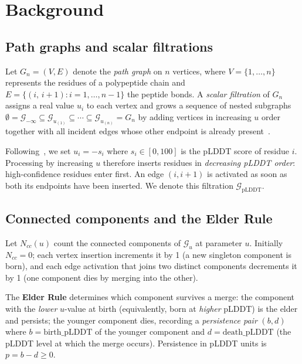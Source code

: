 \section{Background}
\label{sec:background}

\subsection{Path graphs and scalar filtrations}

Let $G_n = (V, E)$ denote the \emph{path graph} on $n$ vertices, where
$V = \{1,\ldots,n\}$ represents the residues of a polypeptide chain and
$E = \{(i,\,i{+}1) : i = 1,\ldots,n{-}1\}$ the peptide bonds.
A \emph{scalar filtration} of $G_n$ assigns a real value $u_i$ to each
vertex and grows a sequence of nested subgraphs
$\emptyset = \mathcal{G}_{-\infty} \subseteq \mathcal{G}_{u_{(1)}} \subseteq
\cdots \subseteq \mathcal{G}_{u_{(n)}} = G_n$
by adding vertices in increasing $u$ order together with all incident
edges whose other endpoint is already present~\cite{edelsbrunner2010computational}.

Following~\cite{cazals2025alphafold}, we set $u_i = -s_i$ where $s_i \in [0,100]$
is the pLDDT score of residue $i$.
Processing by increasing $u$ therefore inserts residues in
\emph{decreasing pLDDT order}: high-confidence residues enter first.
An edge $(i,i{+}1)$ is activated as soon as both its endpoints have been
inserted.
We denote this filtration $\mathcal{G}_{\mathrm{pLDDT}}$.

\subsection{Connected components and the Elder Rule}

Let $N_{cc}(u)$ count the connected components of $\mathcal{G}_u$ at
parameter $u$.
Initially $N_{cc} = 0$; each vertex insertion increments it by 1 (a new
singleton component is born), and each edge activation that joins two distinct
components decrements it by 1 (one component dies by merging into the other).

The \textbf{Elder Rule} determines which component survives a merge:
the component with the \emph{lower} $u$-value at birth (equivalently, born at
\emph{higher} pLDDT) is the elder and persists; the younger component dies,
recording a \emph{persistence pair} $(b, d)$ where $b = \mathrm{birth\_pLDDT}$
of the younger component and $d = \mathrm{death\_pLDDT}$ (the pLDDT level at
which the merge occurs).
Persistence in pLDDT units is $p = b - d \geq 0$.

